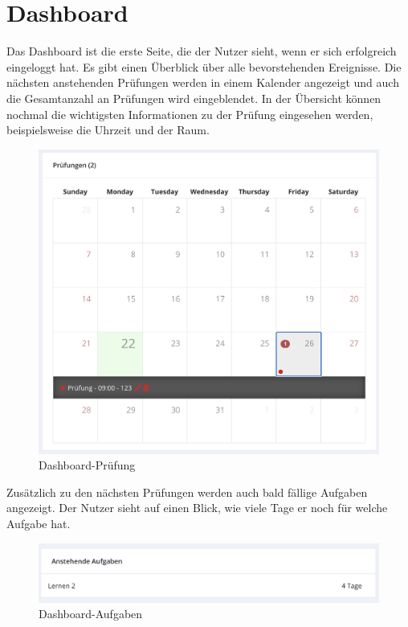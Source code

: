 \section{Dashboard}\label{sec:dashboard}
Das Dashboard ist die erste Seite, die der Nutzer sieht, wenn er sich erfolgreich eingeloggt hat. Es gibt einen Überblick über alle bevorstehenden Ereignisse.
Die nächsten anstehenden Prüfungen werden in einem Kalender angezeigt und auch die Gesamtanzahl an Prüfungen wird eingeblendet. In der Übersicht können nochmal die wichtigsten 
Informationen zu der Prüfung eingesehen werden, beispielsweise die Uhrzeit und der Raum. 
\begin{figure}[h]
    \centering
    \includegraphics[width=.7\textwidth]{img/Dashboard_3.png}
    \caption{Dashboard-Prüfung}
    \label{fig:Dashboardansicht}
\end{figure}
Zusätzlich zu den nächsten Prüfungen werden auch bald fällige Aufgaben angezeigt. Der Nutzer sieht auf einen Blick, wie viele Tage er noch für welche Aufgabe hat.
\begin{figure}[h]
    \centering
    \includegraphics[width=.7\textwidth]{img/Dashboard_4.png}
    \caption{Dashboard-Aufgaben}
    \label{fig:Dashboardaufgaben}
\end{figure}

